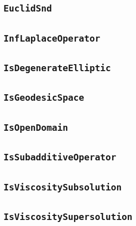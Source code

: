 \documentclass[11pt]{amsart}
\theoremstyle{definition}
\begin{document}
\subsection{\texorpdfstring{\texttt{EuclidSnd}}{EuclidSnd}}\label{node:EuclidSnd}


\subsection{\texorpdfstring{\texttt{InfLaplaceOperator}}{InfLaplaceOperator}}\label{node:InfLaplaceOperator}


\subsection{\texorpdfstring{\texttt{IsDegenerateElliptic}}{IsDegenerateElliptic}}\label{node:IsDegenerateElliptic}


\subsection{\texorpdfstring{\texttt{IsGeodesicSpace}}{IsGeodesicSpace}}\label{node:IsGeodesicSpace}


\subsection{\texorpdfstring{\texttt{IsOpenDomain}}{IsOpenDomain}}\label{node:IsOpenDomain}


\subsection{\texorpdfstring{\texttt{IsSubadditiveOperator}}{IsSubadditiveOperator}}\label{node:IsSubadditiveOperator}


\subsection{\texorpdfstring{\texttt{IsViscositySubsolution}}{IsViscositySubsolution}}\label{node:IsViscositySubsolution}


\subsection{\texorpdfstring{\texttt{IsViscositySupersolution}}{IsViscositySupersolution}}\label{node:IsViscositySupersolution}

\end{document}
